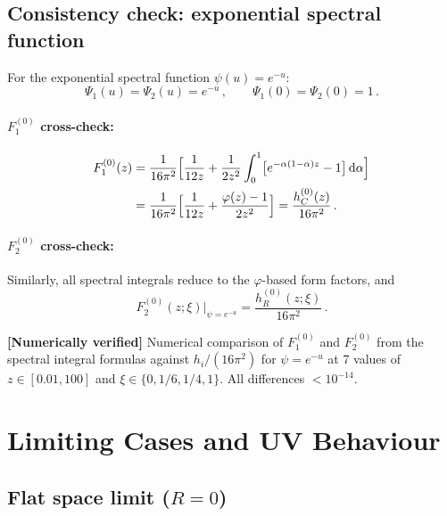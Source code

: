 \documentclass[11pt,a4paper]{article}
\newcommand{\dd}{\mathrm{d}}
\theoremstyle{definition}
\theoremstyle{remark}
\newcommand{\verified}[1]{%
  \par\noindent\colorbox{green!10}{%
    \parbox{\dimexpr\linewidth-2\fboxsep}{%
      \textcolor{green!50!black}{\textbf{[Numerically verified]}}
      \textcolor{green!50!black}{#1}%
    }%
  }\par%
}
\begin{document}
\subsection{Consistency check: exponential spectral function}

For the exponential spectral function $\psi(u) = e^{-u}$:
\begin{equation}
  \Psi_1(u) = \Psi_2(u) = e^{-u}\,,\qquad
  \Psi_1(0) = \Psi_2(0) = 1\,.
  \label{eq:exp-psi}
\end{equation}

\paragraph{$F_1^{(0)}$ cross-check:}
\begin{align*}
  F_1^{(0)}(z) &= \frac{1}{16\pi^2}\Bigl[
  \frac{1}{12z}
  + \frac{1}{2z^2}\int_0^1\bigl[e^{-\alpha(1-\alpha)z} - 1\bigr]
  \,\dd\alpha\Bigr]\\
  &= \frac{1}{16\pi^2}\Bigl[
  \frac{1}{12z} + \frac{\varphi(z)-1}{2z^2}\Bigr]
  = \frac{h_C^{(0)}(z)}{16\pi^2}\,.
\end{align*}

\paragraph{$F_2^{(0)}$ cross-check:}
Similarly, all spectral integrals reduce to the $\varphi$-based
form factors, and
\begin{equation}
  F_2^{(0)}(z;\xi)\Big|_{\psi=e^{-u}}
  = \frac{h_R^{(0)}(z;\xi)}{16\pi^2}\,.
  \label{eq:F2-exp-check}
\end{equation}

\verified{Numerical comparison of $F_1^{(0)}$ and $F_2^{(0)}$ from
the spectral integral formulas against $h_i/(16\pi^2)$ for
$\psi = e^{-u}$ at 7 values of $z \in [0.01, 100]$ and
$\xi \in \{0, 1/6, 1/4, 1\}$.  All differences $< 10^{-14}$.}


\section{Limiting Cases and UV Behaviour}
\label{sec:limits}

\subsection{Flat space limit ($R = 0$)}
\end{document}

